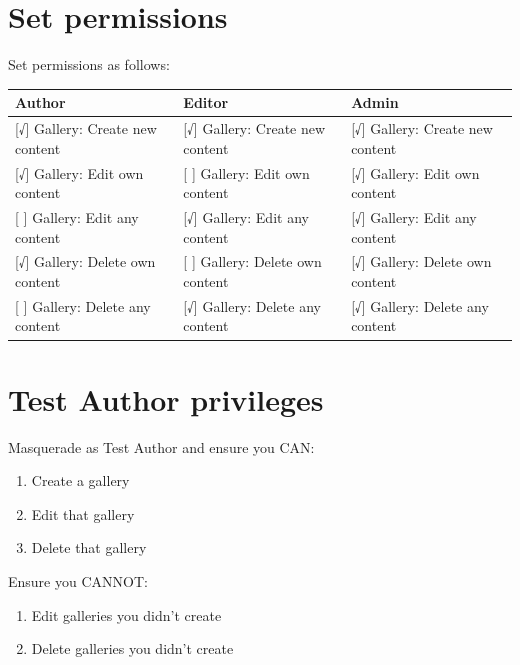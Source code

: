 \documentclass[letterpaper,10pt,english]{sphinxmanual}
\begin{document}
\section{Set permissions}
\label{slideshows:set-permissions}
Set permissions as follows:

\begin{tabulary}{\linewidth}{|L|L|L|}
\hline
\textbf{
Author
} & \textbf{
Editor
} & \textbf{
Admin
}\\\hline

{[}√{]} Gallery: Create new content
 & 
{[}√{]} Gallery: Create new content
 & 
{[}√{]} Gallery: Create new content
\\\hline

{[}√{]}  Gallery: Edit own content
 & 
{[} {]}  Gallery: Edit own content
 & 
{[}√{]} Gallery: Edit own content
\\\hline

{[} {]}   Gallery: Edit any content
 & 
{[}√{]} Gallery: Edit any content
 & 
{[}√{]} Gallery: Edit any content
\\\hline

{[}√{]}  Gallery: Delete own content
 & 
{[} {]}  Gallery: Delete own content
 & 
{[}√{]} Gallery: Delete own content
\\\hline

{[} {]}   Gallery: Delete any content
 & 
{[}√{]}  Gallery: Delete any content
 & 
{[}√{]} Gallery: Delete any content
\\\hline
\end{tabulary}



\section{Test Author privileges}
\label{slideshows:test-author-privileges}
Masquerade as Test Author and ensure you CAN:
\begin{enumerate}
\item {} 
Create a gallery

\item {} 
Edit that gallery

\item {} 
Delete that gallery

\end{enumerate}

Ensure you CANNOT:
\begin{enumerate}
\item {} 
Edit galleries you didn’t create

\item {} 
Delete galleries you didn’t create

\end{enumerate}
\end{document}
